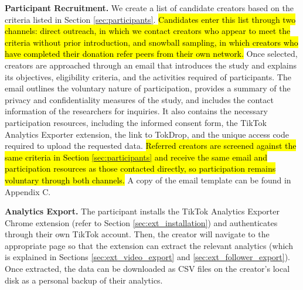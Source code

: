 \textbf{Participant Recruitment.} We create a list of candidate creators based on the criteria listed in Section \ref{sec:participants}. \hl{Candidates enter this list through two channels: direct outreach, in which we contact creators who appear to meet the criteria without prior introduction, and snowball sampling, in which creators who have completed their donation refer peers from their own network.} Once selected, creators are approached through an email that introduces the study and explains its objectives, eligibility criteria, and the activities required of participants. The email outlines the voluntary nature of participation, provides a summary of the privacy and confidentiality measures of the study, and includes the contact information of the researchers for inquiries. It also contains the necessary participation resources, including the informed consent form, the TikTok Analytics Exporter extension, the link to TokDrop, and the unique access code required to upload the requested data. \hl{Referred creators are screened against the same criteria in Section \mbox{\ref{sec:participants}} and receive the same email and participation resources as those contacted directly, so participation remains voluntary through both channels.} A copy of the email template can be found in Appendix C.

\textbf{Analytics Export.} The participant installs the TikTok Analytics Exporter Chrome extension (refer to Section \ref{sec:ext_installation}) and authenticates through their own TikTok account. Then, the creator will navigate to the appropriate page so that the extension can extract the relevant analytics (which is explained in Sections \ref{sec:ext_video_export} and \ref{sec:ext_follower_export}). Once extracted, the data can be downloaded as CSV files on the creator's local disk as a personal backup of their analytics.


